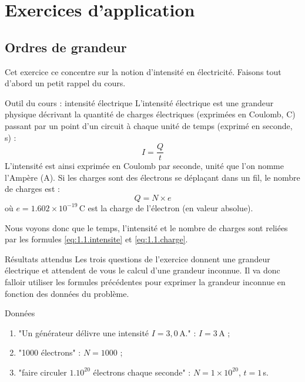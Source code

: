 \documentclass[10pt,a5paper,notitlepage]{book}
\begin{document}
\section{Exercices d'application}
\subsection{Ordres de grandeur}

Cet exercice ce concentre sur la notion d'intensité en électricité. Faisons tout
d'abord un petit rappel du cours.

\begin{NCrapp}{Outil du cours : intensité électrique}
    L'intensité électrique est une grandeur physique décrivant la quantité de
    charges électriques (exprimées en Coulomb, C) passant par un point d'un
    circuit à chaque unité de temps (exprimé en seconde, s) :
	\begin{equation}
		I = \dfrac{Q}{t} \label{eq:1.1.intensite}
	\end{equation}
    L'intensité est ainsi exprimée en Coulomb par seconde, unité que l'on nomme
    l'Ampère (A). Si les charges sont des électrons se déplaçant dans un fil, le
    nombre de charges est :
	\begin{equation}
		Q = N\times e \label{eq:1.1.charge}
	\end{equation}
    où $e = 1.602\times 10^{-19}\,$C est la charge de l'électron (en valeur
    absolue).
\end{NCrapp}

Nous voyons donc que le temps, l'intensité et le nombre de charges sont reliées
par les formules \ref{eq:1.1.intensite} et \ref{eq:1.1.charge}.

\begin{NCprop}{Résultats attendus}
    Les trois questions de l'exercice donnent une grandeur électrique et
    attendent de vous le calcul d'une grandeur inconnue. Il va donc falloir
    utiliser les formules précédentes pour exprimer la grandeur inconnue en
    fonction des données du problème.
\end{NCprop}

\begin{NCdefi}{Données}
	\begin{enumerate}
        \item "Un générateur délivre une intensité $I = 3,0\,$A." : $I = 3\,$A ;
		\item "1000 électrons" : $N = 1000$ ;
        \item "faire circuler $1.10^{20}$ électrons chaque seconde" : $N =
            1\times 10^{20}$, $t = 1\,$s.
	\end{enumerate}
\end{NCdefi}
\end{document}
